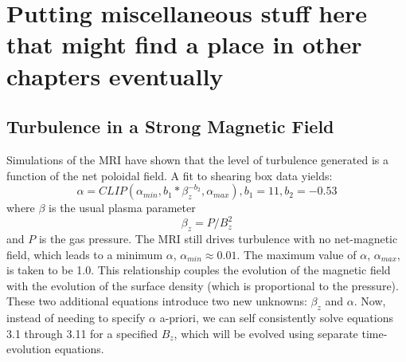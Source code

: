 \chapter{Putting miscellaneous stuff here that might find a place in other chapters eventually}
\label{misc}


\section{Turbulence in a Strong Magnetic Field}
Simulations of the MRI have shown that the level of turbulence generated is a function of the net poloidal field.  A fit to shearing box data yields:
\begin{equation}
\alpha = CLIP(\alpha_{min}, b_1 * \beta_z^{-b_2},\alpha_{max}), b_1=11, b_2=-0.53
\end{equation}
\noindent where $\beta$ is the usual plasma parameter 
\begin{equation}
\beta_z=P/B_z^2
\end{equation} 
and $P$ is the gas pressure.   The MRI still drives turbulence with no net-magnetic field, which leads to a minimum $\alpha$, $\alpha_{min} \approx 0.01$.  The maximum value of $\alpha$, $\alpha_{max}$, is taken to be 1.0.  This relationship couples the evolution of the magnetic field with the evolution of the surface density (which is proportional to the pressure). These two additional equations introduce two new unknowns: $\beta_z$ and $\alpha$.  Now, instead of needing to specify $\alpha$ a-priori, we can self consistently solve equations 3.1 through 3.11 for a specified $B_z$, which will be evolved using separate time-evolution equations. 